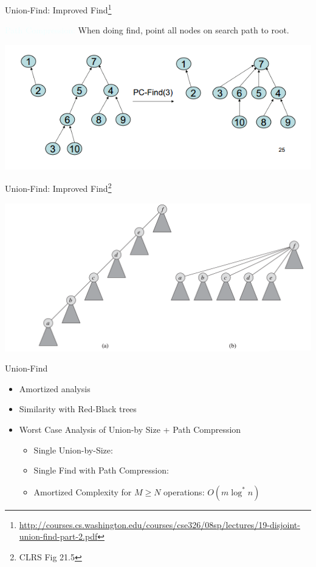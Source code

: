 \documentclass{beamer}
\newcommand{\tblue}[1]{{\Large {\textcolor{azure}{#1}}}}
\begin{document}
\begin{frame}{Union-Find: Improved Find\footnote{\url{http://courses.cs.washington.edu/courses/cse326/08sp/lectures/19-disjoint-union-find-part-2.pdf}}}

    \tblue{Path Compression:} When doing find, point all nodes on search path to root.
    \begin{center}
        \includegraphics[scale=0.5]{pathCompression2.png} 
    \end{center}
\end{frame}

\begin{frame}{Union-Find: Improved Find\footnote{CLRS Fig 21.5}}
    \begin{center}
        \includegraphics[scale=0.3]{pathCompression4.png} 
    \end{center}
\end{frame}

\begin{frame}{Union-Find}
    \begin{itemize}
        \item Amortized analysis
        \item Similarity with Red-Black trees
        \item Worst Case Analysis of Union-by Size + Path Compression
        \begin{itemize}
            \item Single Union-by-Size:
            \item Single Find with Path Compression: 
            \item Amortized Complexity for $M \geq N$ operations: $O(m \log^{*} n)$
        \end{itemize}
    \end{itemize}
\end{frame}
\end{document}
